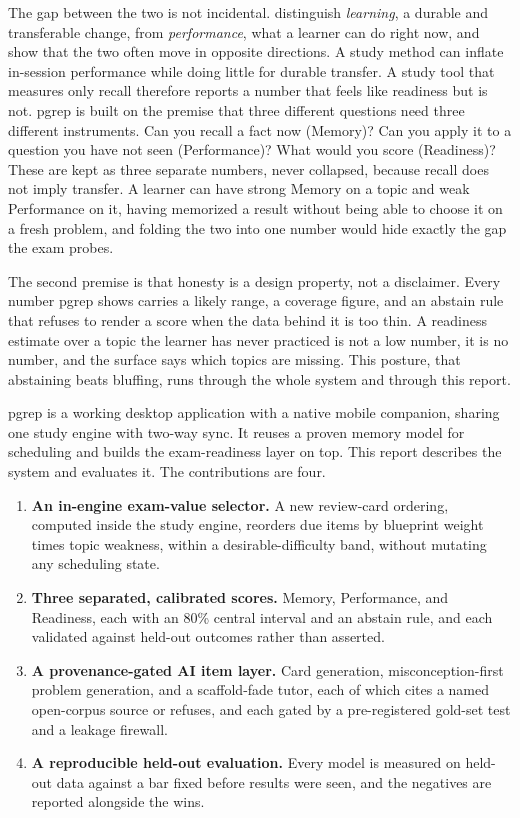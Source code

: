 \documentclass[11pt]{article}
\begin{document}
The gap between the two is not incidental. \citet{soderstrom2015} distinguish
\emph{learning}, a durable and transferable change, from \emph{performance}, what a
learner can do right now, and show that the two often move in opposite directions.
A study method can inflate in-session performance while doing little for durable
transfer. A study tool that measures only recall therefore reports a number that
feels like readiness but is not. pgrep is built on the premise that three different
questions need three different instruments. Can you recall a fact now (Memory)? Can
you apply it to a question you have not seen (Performance)? What would you score
(Readiness)? These are kept as three separate numbers, never collapsed, because
recall does not imply transfer. A learner can have strong Memory on a topic and weak
Performance on it, having memorized a result without being able to choose it on a fresh
problem, and folding the two into one number would hide exactly the gap the exam probes.

The second premise is that honesty is a design property, not a disclaimer. Every
number pgrep shows carries a likely range, a coverage figure, and an abstain rule
that refuses to render a score when the data behind it is too thin. A readiness
estimate over a topic the learner has never practiced is not a low number, it is no
number, and the surface says which topics are missing. This posture, that abstaining
beats bluffing, runs through the whole system and through this report.

pgrep is a working desktop application with a native mobile companion, sharing one
study engine with two-way sync. It reuses a proven memory model for scheduling and
builds the exam-readiness layer on top. This report describes the system and
evaluates it. The contributions are four.

\begin{enumerate}[leftmargin=1.4em]
\item \textbf{An in-engine exam-value selector.} A new review-card ordering, computed
inside the study engine, reorders due items by blueprint weight times topic weakness,
within a desirable-difficulty band, without mutating any scheduling state.
\item \textbf{Three separated, calibrated scores.} Memory, Performance, and Readiness,
each with an 80\% central interval and an abstain rule, and each validated against
held-out outcomes rather than asserted.
\item \textbf{A provenance-gated AI item layer.} Card generation, misconception-first
problem generation, and a scaffold-fade tutor, each of which cites a named open-corpus
source or refuses, and each gated by a pre-registered gold-set test and a leakage
firewall.
\item \textbf{A reproducible held-out evaluation.} Every model is measured on held-out
data against a bar fixed before results were seen, and the negatives are reported
alongside the wins.
\end{enumerate}
\end{document}
